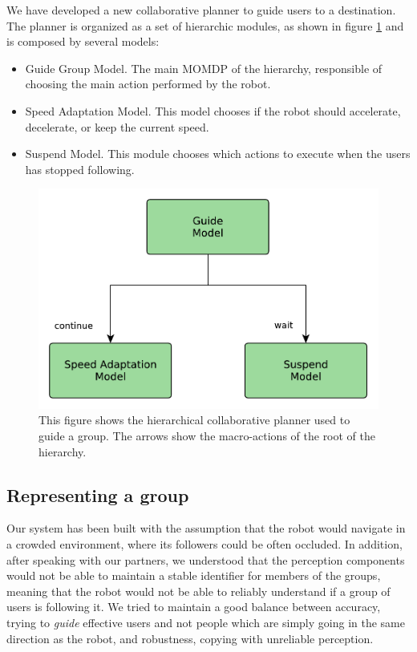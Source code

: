 We have developed a new collaborative planner to guide users to a destination. The planner is organized as a set of hierarchic modules, as shown in figure \ref{fig:case_study-spencer-guide_planner} and is composed by several models:
\begin{itemize}
\item Guide Group Model. The main MOMDP of the hierarchy, responsible of choosing the main action performed by the robot.
\item Speed Adaptation Model. This model chooses if the robot should accelerate, decelerate, or keep the current speed.
\item Suspend Model. This module chooses which actions to execute when the users has stopped following. 
\end{itemize}



\begin{figure}[ht!]
	\centering
	\includegraphics[scale=0.45]{img/case_study/spencer/guide_planner.pdf}
	\caption[Collaborative planner for guiding]{This figure shows the hierarchical collaborative planner used to guide a group. The arrows show the macro-actions of the root of the hierarchy.}
	\label{fig:case_study-spencer-guide_planner}
\end{figure}

\subsection{Representing a group}
\label{subsec:spencer-group}
Our system has been built with the assumption that the robot would navigate in a crowded environment, where its followers could be often occluded. In addition, after speaking with our partners, we understood that the perception components would not be able to maintain a stable identifier for members of the groups, meaning that the robot would not be able to reliably understand if a group of users is following it. We tried to maintain a good balance between accuracy, trying to \textit{guide} effective users and not people which are simply going in the same direction as the robot, and robustness, copying with unreliable perception.


